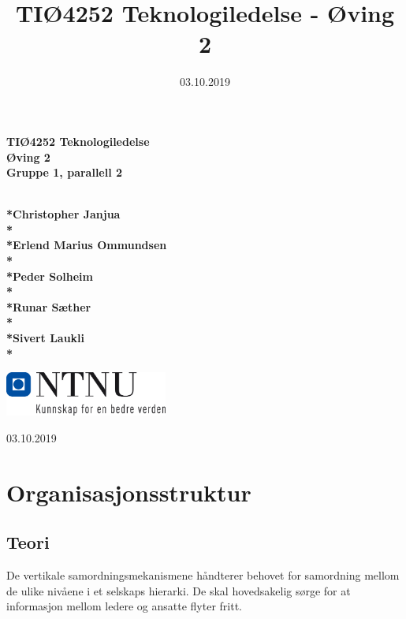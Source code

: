 \documentclass[norsk]{article}
\begin{document}
\renewcommand{\thefootnote}{\roman{footnote}}
\title{TIØ4252 Teknologiledelse - Øving 2}
\author{}
\date{03.10.2019}

\begin{titlepage}
   \begin{center}
 
        \textbf{\huge TIØ4252 Teknologiledelse}\\
        \vspace{4cm}
        \textbf{\huge Øving 2}\\
        \vspace{0.5cm}
        \textbf{\small Gruppe 1, parallell 2}
        
        \vspace{5cm}
        
        \textbf{\small\\*Christopher Janjua\\* }
        \textbf{\small\\*Erlend Marius Ommundsen\\* }
        \textbf{\small\\*Peder Solheim\\* }
        \textbf{\small\\*Runar Sæther\\* }
        \textbf{\small\\*Sivert Laukli\\* }
        
        \vspace{1cm}
 
        \includegraphics[width=0.4\textwidth, draft=false]{Vedlegg/ntnuLogo.png}
 
        03.10.2019
 
   \end{center}
\end{titlepage}

\newpage
\section{Organisasjonsstruktur}

\subsection{Teori}
De vertikale samordningsmekanismene håndterer behovet for samordning mellom de ulike nivåene i et selskaps hierarki. De skal hovedsakelig sørge for at informasjon mellom ledere og ansatte flyter fritt.
\end{document}
